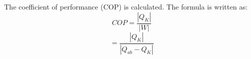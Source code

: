 The coefficient of performance (COP) is calculated.  
The formula is written as:  
\[ COP = \frac{|Q_K|}{|W|} \]  
\[ = \frac{|Q_K|}{|Q_{ab} - Q_K|} \]